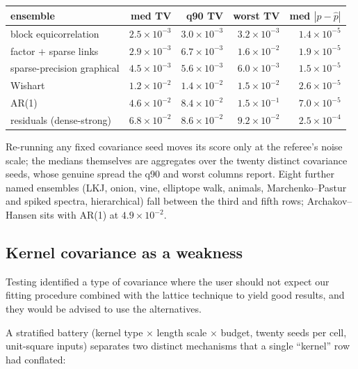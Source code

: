 \documentclass[11pt]{article}
\begin{document}
\begin{center}\small
\begin{tabular}{lrrrr}
\toprule
ensemble & med TV & q90 TV & worst TV & med $|p-\hat p|$\\
\midrule
block equicorrelation & $2.5\times10^{-3}$ & $3.0\times10^{-3}$ & $3.2\times10^{-3}$ & $1.4\times10^{-5}$\\
factor $+$ sparse links & $2.9\times10^{-3}$ & $6.7\times10^{-3}$ & $1.6\times10^{-2}$ & $1.9\times10^{-5}$\\
sparse-precision graphical & $4.5\times10^{-3}$ & $5.6\times10^{-3}$ & $6.0\times10^{-3}$ & $1.5\times10^{-5}$\\
Wishart & $1.2\times10^{-2}$ & $1.4\times10^{-2}$ & $1.5\times10^{-2}$ & $2.6\times10^{-5}$\\
AR(1) & $4.6\times10^{-2}$ & $8.4\times10^{-2}$ & $1.5\times10^{-1}$ & $7.0\times10^{-5}$\\
residuals (dense-strong) & $6.8\times10^{-2}$ & $8.6\times10^{-2}$ & $9.2\times10^{-2}$ & $2.5\times10^{-4}$\\
\bottomrule
\end{tabular}
\end{center}

Re-running any fixed covariance seed moves its score only at the
referee's noise scale; the medians themselves are aggregates over the
twenty distinct covariance seeds, whose genuine spread the q90 and worst
columns report. Eight further named
ensembles (LKJ, onion, vine, elliptope walk, animals, Marchenko--Pastur
and spiked spectra, hierarchical) fall between the third and fifth
rows; Archakov--Hansen sits with AR(1) at $4.9\times10^{-2}$.

\subsection{Kernel covariance as a weakness}

Testing identified a type of covariance where the user should not expect our fitting procedure combined with the lattice technique to yield good results, and they would be advised to use the alternatives.

A stratified battery
(kernel type $\times$ length scale $\times$ budget, twenty seeds per
cell, unit-square inputs) separates two distinct mechanisms that a
single ``kernel'' row had conflated:
\end{document}
